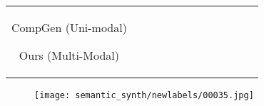 \documentclass[10pt,twocolumn,letterpaper]{article}
\begin{document}
\begin{figure*}[htb!]
{\begin{tabular}{c c c c c c c c c c c c}
\tabularnewline
\vspace{2mm}
\begin{minipage}{0.5\linewidth}
\hspace{3cm}
CompGen (Uni-modal)\cite{liu2022compositional}
\end{minipage}
\begin{minipage}{0.5\linewidth}
\hspace{4cm}
Ours (Multi-Modal)
\end{minipage}
\end{tabular}}
\vspace{-0.4cm}
\hspace{20pt}
\label{fig:facelrfid}
\vspace{-2mm}
\end{figure*} \begin{figure*}[t!]
    \centering
    \begin{subfigure}[t]{0.137\linewidth}
      \captionsetup{justification=centering, labelformat=empty, font=scriptsize}
      \texttt{[image: semantic\_synth/newlabels/00035.jpg]}


\end{subfigure}
\end{figure*}
\end{document}
